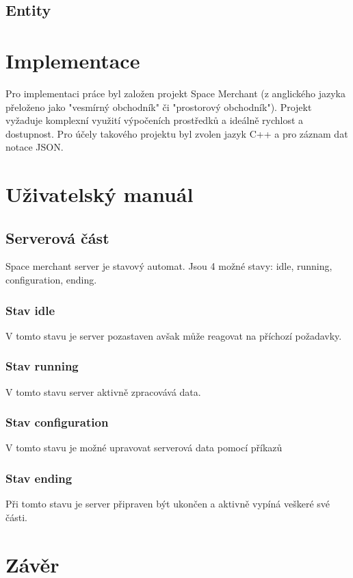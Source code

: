 \documentclass[FM,BP]{tulthesis}
\begin{document}
\section{Entity}

\chapter{Implementace}
Pro implementaci práce byl založen projekt Space Merchant (z anglického jazyka přeloženo jako "vesmírný obchodník" či "prostorový obchodník"). Projekt vyžaduje komplexní využití výpočeních prostředků a ideálně rychlost a dostupnost. Pro účely takového projektu byl zvolen jazyk C++ a pro záznam dat notace JSON.


\chapter{Uživatelský manuál}
\section{Serverová část}
Space merchant server je stavový automat. Jsou 4 možné stavy: idle, running, configuration, ending.
\subsection{Stav idle}
V tomto stavu je server pozastaven avšak může reagovat na příchozí požadavky.

\subsection{Stav running}
V tomto stavu server aktivně zpracovává data.

\subsection{Stav configuration}
V tomto stavu je možné upravovat serverová data pomocí příkazů

\subsection{Stav ending}
Při tomto stavu je server připraven být ukončen a aktivně vypíná veškeré své části.



\chapter*{Závěr}
\end{document}
